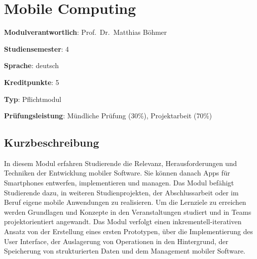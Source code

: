 \hypertarget{mobile-computingpathlabelmi-2017modulbeschreibungen-bachelorba_mobile-computing}{%
\chapter{Mobile
Computing\label{/mi-2017/modulbeschreibungen-bachelor/BA_Mobile-Computing}}\label{mobile-computingpathlabelmi-2017modulbeschreibungen-bachelorba_mobile-computing}}

\begin{modulHead}
\textbf{Modulverantwortlich}: Prof.~Dr.~Matthias
Böhmer
\end{modulHead}
\begin{modulHead}
\textbf{Studiensemester}:
4
\end{modulHead}
\begin{modulHead}
\textbf{Sprache}:
deutsch
\end{modulHead}
\begin{modulHead}
\textbf{Kreditpunkte}:
5
\end{modulHead}
\begin{modulHead}
\textbf{Typ}:
Pflichtmodul
\end{modulHead}
\begin{modulHead}
\textbf{Prüfungsleistung}:
Mündliche Prüfung (30\%), Projektarbeit (70\%)
\end{modulHead}


\hypertarget{kurzbeschreibungpathlabelmi-2017modulbeschreibungen-bachelorba_mobile-computing}{%
\section*{Kurzbeschreibung\label{/mi-2017/modulbeschreibungen-bachelor/BA_Mobile-Computing}}\label{kurzbeschreibungpathlabelmi-2017modulbeschreibungen-bachelorba_mobile-computing}}

In diesem Modul erfahren Studierende die Relevanz, Herausforderungen und
Techniken der Entwicklung mobiler Software. Sie können danach Apps für
Smartphones entwerfen, implementieren und managen. Das Modul befähigt
Studierende dazu, in weiteren Studienprojekten, der Abschlussarbeit oder
im Beruf eigene mobile Anwendungen zu realisieren. Um die Lernziele zu
erreichen werden Grundlagen und Konzepte in den Veranstaltungen studiert
und in Teams projektorientiert angewandt. Das Modul verfolgt einen
inkrementell-iterativen Ansatz von der Erstellung eines ersten
Prototypen, über die Implementierung des User Interface, der Auslagerung
von Operationen in den Hintergrund, der Speicherung von strukturierten
Daten und dem Management mobiler Software.

